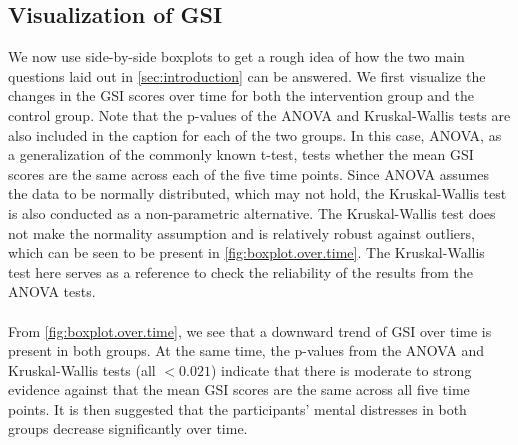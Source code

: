 \subsection{Visualization of GSI}
We now use side-by-side boxplots to get a rough idea of how the two main questions laid out in \cref{sec:introduction} can be answered. We first visualize the changes in the GSI scores over time for both the intervention group and the control group. Note that the p-values of the ANOVA and Kruskal-Wallis tests are also included in the caption for each of the two groups. In this case, ANOVA, as a generalization of the commonly known t-test, tests whether the mean GSI scores are the same across each of the five time points. Since ANOVA assumes the data to be normally distributed, which may not hold, the Kruskal-Wallis test is also conducted as a non-parametric alternative. The Kruskal-Wallis test does not make the normality assumption and is relatively robust against outliers, which can be seen to be present in \cref{fig:boxplot.over.time}. The Kruskal-Wallis test here serves as a reference to check the reliability of the results from the ANOVA tests.\\\\
From \cref{fig:boxplot.over.time}, we see that a downward trend of GSI over time is present in both groups. At the same time, the p-values from the ANOVA and Kruskal-Wallis tests (all $<0.021$) indicate that there is moderate to strong evidence against that the mean GSI scores are the same across all five time points. It is then suggested that the participants' mental distresses in both groups decrease significantly over time.
